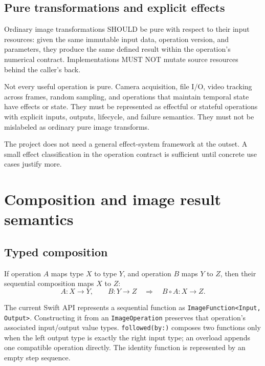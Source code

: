 \documentclass[11pt,a4paper,oneside]{article}
\begin{document}
\subsection{Pure transformations and explicit effects}

Ordinary image transformations SHOULD be pure with respect to their input resources: given the same immutable input data, operation version, and parameters, they produce the same defined result within the operation's numerical contract. Implementations MUST NOT mutate source resources behind the caller's back.

Not every useful operation is pure. Camera acquisition, file I/O, video tracking across frames, random sampling, and operations that maintain temporal state have effects or state. They must be represented as effectful or stateful operations with explicit inputs, outputs, lifecycle, and failure semantics. They must not be mislabeled as ordinary pure image transforms.

The project does not need a general effect-system framework at the outset. A small effect classification in the operation contract is sufficient until concrete use cases justify more.

\section{Composition and image result semantics}

\subsection{Typed composition}

If operation $A$ maps type $X$ to type $Y$, and operation $B$ maps $Y$ to $Z$, then their sequential composition maps $X$ to $Z$:
\[
  A : X \rightarrow Y,\qquad B : Y \rightarrow Z
  \quad\Longrightarrow\quad
  B\circ A : X \rightarrow Z.
\]

The current Swift API represents a sequential function as \texttt{ImageFunction<Input, Output>}. Constructing it from an \texttt{ImageOperation} preserves that operation's associated input/output value types. \texttt{followed(by:)} composes two functions only when the left output type is exactly the right input type; an overload appends one compatible operation directly. The identity function is represented by an empty step sequence.
\end{document}
